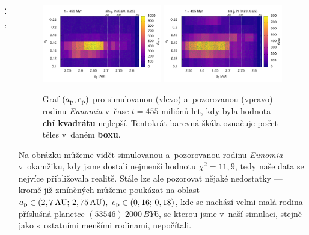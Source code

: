 \documentclass{beamer}
\newlength{\sep}
\newlength{\vyska}
\newlength{\vyskaC}
\newlength{\side}
\begin{document}
\begin{frame}
\begin{columns}[t]
\begin{column}{2\sep}
\end{column}

\begin{column}{\side}
\begin{tcolorbox}[title=Závěry\phantom{Úy},height=0.38\vyskaC]
	\begin{figure}
		\centering
		\includegraphics[width=0.49\textwidth]{../obr/ae_scl_trans.png}
		\includegraphics[width=0.49\textwidth]{../obr/ae_obs_trans.png}
		\caption{Graf $(a_{\rm p}, e_{\rm p})$ pro simulovanou (vlevo) a~pozorovanou (vpravo) rodinu \textit{Eunomia} v~čase $t=455$ miliónů let, kdy byla hodnota \textbf{chí kvadrátu} nejlepší. Tentokrát barevná škála označuje počet těles v~daném \textbf{boxu}.}
	\end{figure}

	Na obrázku můžeme vidět simulovanou a~pozorovanou rodinu \textit{Eunomia} v~okamžiku, kdy jsme dostali nejmenší hodnotu $\chi^2=11,9$, tedy naše data se nejvíce přibližovala realitě. Stále lze ale pozorovat nějaké nedostatky --- kromě již zmíněných můžeme poukázat na oblast $a_{\rm p}\in(2,7\,{\rm AU};\,2,75\,{\rm AU}),\ e_{\rm p}\in(0,16;\,0,18)$, kde se nachází velmi malá rodina příslušná planetce $(53546)\ 2000\,BY6$, se kterou jsme v~naší simulaci, stejně jako s~ostatními menšími rodinami, nepočítali.


\end{tcolorbox}
\end{column}
\end{columns}
\end{frame}
\end{document}
